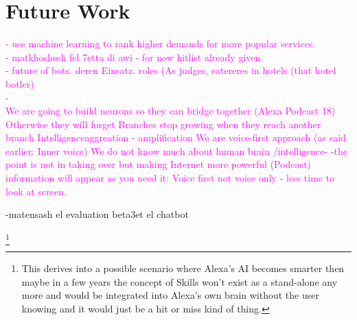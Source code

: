 \section{Future Work}
\textcolor{magenta}{
- use machine learning to rank higher demands for more popular services.\\ 
- matkhoshesh fel 7etta di awi - for now hitlist already given.\\
- future of bots. deren Einsatz. roles (As judges, catereres in hotels (that hotel botler) \\
-\\
We are going to build neurons so they can bridge together (Alexa Podcast 18)
Otherwise they will forget 
Branches stop growing when they reach another branch
Intelligenceaggreation - amplification 
We are voice-first approach (as said earlier: Inner voice)
We do not know much about human brain /intelligence-
-the point is not in taking over but making Internet more powerful (Podcast)
information will appear as you need it: 
Voice first not voice only - less time to look at screen. 
}

-matensash el evaluation beta3et el chatbot






\footnote{This derives into a possible scenario where Alexa's AI becomes smarter then maybe in a few years the concept of Skills won't exist as a stand-alone any more and would be integrated into Alexa's own brain without the user knowing and it would just be a hit or miss kind of thing.}